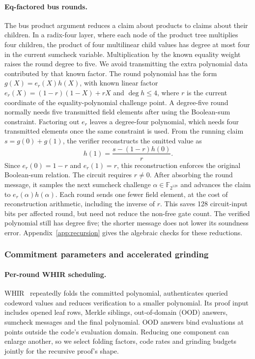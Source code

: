 \documentclass[11pt]{article}
\newcommand{\F}{\mathbb{F}_{2^{128}}}
\begin{document}
\paragraph{Eq-factored bus rounds.} The bus product argument reduces a
claim about products to claims about their children. In a radix-four layer, where each node of the product tree multiplies four children, the product of four multilinear child values has degree at most four in
the current sumcheck variable. Multiplication by the known equality weight
raises the round degree to five. We avoid transmitting the extra polynomial
data contributed by that known factor. The round polynomial has the form $g(X)=e_r(X)h(X)$, with known
linear factor $e_r(X)=(1-r)(1-X)+rX$ and $\deg h\le4$, where $r$ is the
current coordinate of the equality-polynomial challenge point. A
degree-five round normally needs five transmitted field elements after
using the Boolean-sum constraint. Factoring out $e_r$ leaves a degree-four
polynomial, which needs four transmitted elements once the same constraint
is used. From the running claim $s=g(0)+g(1)$, the verifier reconstructs the
omitted value as
\[
  h(1)=\frac{s-(1-r)h(0)}{r}.
\]
Since $e_r(0)=1-r$ and $e_r(1)=r$, this reconstruction enforces the
original Boolean-sum relation. The circuit requires $r\ne0$. After absorbing
the round message, it samples
the next sumcheck challenge $\alpha\in\F$ and advances the claim to
$e_r(\alpha)h(\alpha)$. Each round sends one fewer field element, at the
cost of reconstruction arithmetic, including the inverse of $r$. This
saves 128 circuit-input bits per affected round, but need not reduce the
non-free gate count. The verified polynomial still has
degree five; the shorter message does not lower its soundness error.
Appendix~\ref{app:recursion} gives the algebraic checks for these reductions.

\subsubsection{Commitment parameters and accelerated grinding}

\paragraph{Per-round WHIR scheduling.} WHIR~\cite{whir25} repeatedly
folds the committed polynomial, authenticates queried codeword values and
reduces verification to a smaller polynomial. Its proof input includes
opened leaf rows, Merkle siblings, out-of-domain (OOD) answers, sumcheck messages
and the final polynomial. OOD answers bind evaluations at points outside
the code's evaluation domain. Reducing one component can enlarge another, so
we select folding factors, code rates and grinding budgets jointly for the
recursive proof's shape.
\end{document}
